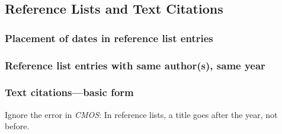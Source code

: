 \documentclass[11pt,letterpaper,oneside]{article}
\begin{document}
\setcounter{subsection}{1}
\subsection{Reference Lists and Text Citations}
\setcounter{subsection}{15}

\setcounter{subsubsection}{13}
\subsubsection{Placement of dates in reference list entries}
\label{15.14}

\begin{citeref}
\item \parencite{pager2015}
\item \parencite{unger2014}
\end{citeref}

\setcounter{subsubsection}{19}
\subsubsection{Reference list entries with same author(s), same year}
\label{15.20}

\begin{citeref}
\item \parencite[218]{fogel2004b}
\item \parencite[45--46]{fogel2004a}
\end{citeref}

\setcounter{subsubsection}{21}
\subsubsection{Text citations---basic form}
\label{15.22}

Ignore the error in \textit{CMOS}: In reference lists, a title goes
after the year, not before.

\begin{citeref}
\item \parencite{hetherington2015}
\item \parencite{grove2015}
\item \parencite{hetherington2015,grove2015}
\end{citeref}

\begin{citeref}
\item \parencite{doershuk2017}
\item \parencite{doershuk2016}
\end{citeref}
\end{document}
